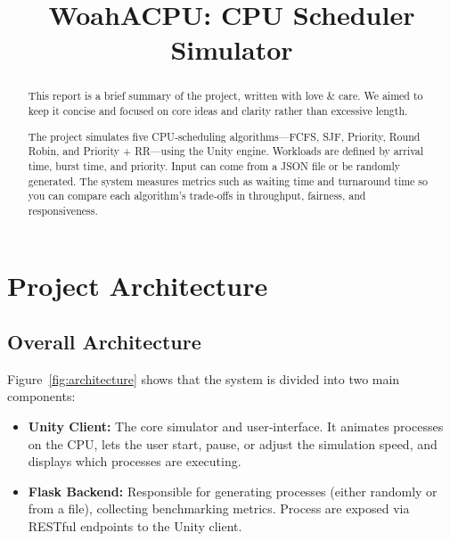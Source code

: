 \documentclass[conference]{IEEEtran}
\begin{document}
\title{WoahACPU: CPU Scheduler Simulator}

\author{
  \and
}


\maketitle

\begin{abstract}
This report is a brief summary of the project, written with love \& care. We aimed to keep it concise and focused on core ideas and clarity rather than excessive length.

The project simulates five CPU‑scheduling algorithms—FCFS, SJF, Priority, Round Robin, and Priority + RR—using the Unity engine. Workloads are defined by arrival time, burst time, and priority. Input can come from a JSON file or be randomly generated. The system measures metrics such as waiting time and turnaround time so you can compare each algorithm’s trade‑offs in throughput, fairness, and responsiveness.
\end{abstract}

\section{Project Architecture}

\subsection{Overall Architecture}

Figure~\ref{fig:architecture} shows that the system is divided into two main components:
\begin{itemize}
  \item \textbf{Unity Client:} The core simulator and user‐interface. It animates processes on the CPU, lets the user start, pause, or adjust the simulation speed, and displays which processes are executing.
  \item \textbf{Flask Backend:} Responsible for generating processes (either randomly or from a file), collecting benchmarking metrics. Process are exposed via RESTful endpoints to the Unity client.
\end{itemize}
\end{document}
